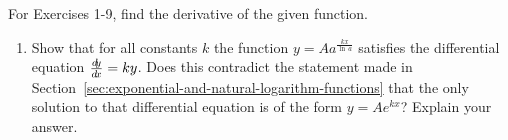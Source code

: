 \divider
\vspace{3mm}
\startexercises\label{sec2dot4}
{\small
{}
\par\noindent For Exercises 1-9, find the derivative of the given function.
\begin{enumerate}[\bfseries 1.]
[{[\bfseries 1.]}]
 \item Show that for all constants $k$ the function $y = A a^{\frac{kx}{\ln\,a}}$
  satisfies the differential equation $\frac{d\negmedspace y}{d\!x} = ky$. Does this contradict the
  statement made in Section~\ref{sec:exponential-and-natural-logarithm-functions} that the only solution to that differential
  equation is of the form $y = A e^{kx}$? Explain your answer.
\end{enumerate}}
